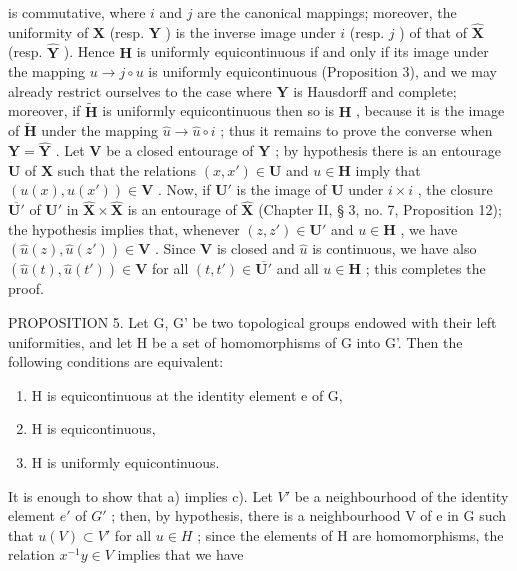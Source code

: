 is commutative, where \(i\) and \(j\) are the canonical mappings; moreover, the uniformity of \(\mathbf{X}\) (resp. \(\mathbf{Y}\) ) is the inverse image under \(i\) (resp. \(j\) ) of that of \(\hat{\mathbf{X}}\) (resp. \(\hat{\mathbf{Y}}\) ). Hence \(\mathbf{H}\) is uniformly equicontinuous if and only if its image under the mapping \(u \to j \circ u\) is uniformly equicontinuous (Proposition 3), and we may already restrict ourselves to the case where \(\mathbf{Y}\) is Hausdorff and complete; moreover, if \(\tilde{\mathbf{H}}\) is uniformly equicontinuous then so is \(\mathbf{H}\) , because it is the image of \(\tilde{\mathbf{H}}\) under the mapping \(\hat{u} \to \hat{u} \circ i\) ; thus it remains to prove the converse when \(\mathbf{Y} = \hat{\mathbf{Y}}\) . Let \(\mathbf{V}\) be a closed entourage of \(\mathbf{Y}\) ; by hypothesis there is an entourage \(\mathbf{U}\) of \(\mathbf{X}\) such that the relations \((x, x') \in \mathbf{U}\) and \(u \in \mathbf{H}\) imply that \((u(x), u(x')) \in \mathbf{V}\) . Now, if \(\mathbf{U}'\) is the image of \(\mathbf{U}\) under \(i \times i\) , the closure \(\overline{\mathbf{U}'}\) of \(\mathbf{U}'\) in \(\hat{\mathbf{X}} \times \hat{\mathbf{X}}\) is an entourage of \(\hat{\mathbf{X}}\) (Chapter II, § 3, no. 7, Proposition 12); the hypothesis implies that, whenever \((z, z') \in \mathbf{U}'\) and \(u \in \mathbf{H}\) , we have \((\hat{u}(z), \hat{u}(z')) \in \mathbf{V}\) . Since \(\mathbf{V}\) is closed and \(\hat{u}\) is continuous, we have also \((\hat{u}(t), \hat{u}(t')) \in \mathbf{V}\) for all \((t, t') \in \overline{\mathbf{U}'}\) and all \(u \in \mathbf{H}\) ; this completes the proof.

PROPOSITION 5. Let G, G' be two topological groups endowed with their left uniformities, and let H be a set of homomorphisms of G into G'. Then the following conditions are equivalent:

\begin{enumerate}
\def\labelenumi{\alph{enumi})}
\item
  H is equicontinuous at the identity element e of G,
\item
  H is equicontinuous,
\item
  H is uniformly equicontinuous.
\end{enumerate}

It is enough to show that a) implies c). Let \(V'\) be a neighbourhood of the identity element \(e'\) of \(G'\) ; then, by hypothesis, there is a neighbourhood V of e in G such that \(u(V) \subset V'\) for all \(u \in H\) ; since the elements of H are homomorphisms, the relation \(x^{-1}y \in V\) implies that we have


